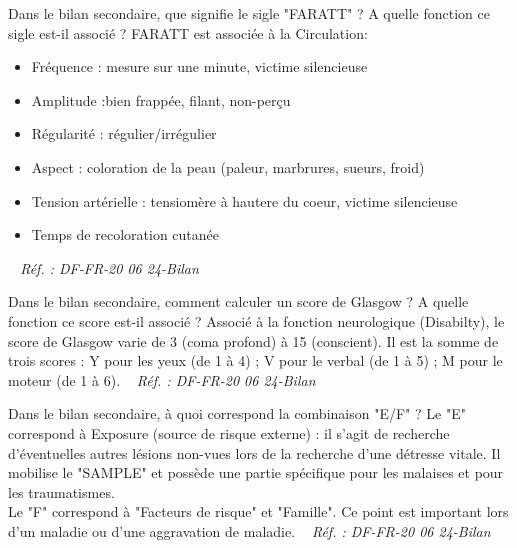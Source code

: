 \documentclass[grid,avery5371,landscape]{flashcards}
\makeatletter
\newcounter{nocarte}
\newcommand{\categ}[1]{%
  \def\@categ{#1}%
  \setcounter{nocarte}{0}%
}
\newcommand{\source}[1]{%
  \medskip
  \itshape%
   ~ \hfill Réf. : #1}
\makeatother
\begin{document}
\color[HTML]{003273}
\categ{PSE}
\begin{flashcard}[bilan]{
 Dans le bilan secondaire, que signifie le sigle "FARATT" ? A quelle fonction ce sigle est-il associé ?   }
  FARATT est associée à la Circulation: \begin{itemize} \item Fréquence : mesure sur une minute, victime silencieuse \item Amplitude :bien frappée, filant, non-perçu \item Régularité : régulier/irrégulier \item Aspect : coloration de la peau (paleur, marbrures, sueurs, froid) \item Tension artérielle : tensiomère à hautere du coeur, victime silencieuse \item Temps de recoloration cutanée  \end{itemize}
  \source{DF-FR-20 06 24-Bilan}
\end{flashcard}


\color[HTML]{003273}
\categ{PSE}
\begin{flashcard}[bilan]{
 Dans le bilan secondaire, comment calculer un score de Glasgow ? A quelle fonction ce score est-il associé ?   }
  Associé à la fonction neurologique (Disabilty), le score de Glasgow varie de 3 (coma profond) à 15 (conscient). Il est la somme de trois scores : Y pour les yeux (de 1 à 4) ; V pour le verbal (de 1 à 5) ; M pour le moteur (de 1 à 6).
  \source{DF-FR-20 06 24-Bilan}
\end{flashcard}


\color[HTML]{003273}
\categ{PSE}
\begin{flashcard}[bilan]{
 Dans le bilan secondaire, à quoi correspond la combinaison "E/F" ?   }
   Le "E" correspond à Exposure (source de risque externe) : il s'agit de recherche d'éventuelles autres lésions non-vues lors de la recherche d'une détresse vitale. Il mobilise le "SAMPLE" et possède une partie spécifique pour les malaises et pour les traumatismes. \\
Le "F" correspond à "Facteurs de risque" et "Famille". Ce point est important lors d'un maladie ou d'une aggravation de maladie.
  \source{DF-FR-20 06 24-Bilan}
\end{flashcard}
\end{document}
